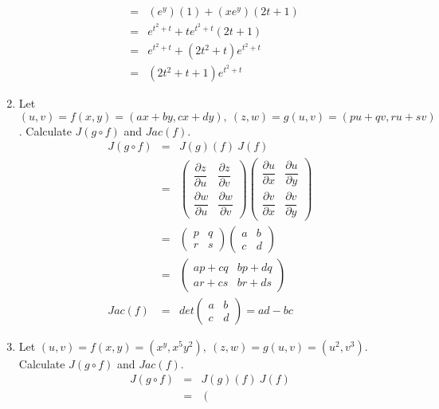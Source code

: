 \documentclass[a4paper,10pt]{article}
\begin{document}
\begin{enumerate}
\begin{eqnarray}
	&=& (e^y)(1) + (xe^y)(2t+1) \\ \nonumber
	&=& e^{t^2+t} + t e^{t^2+t} (2t+1) \\ \nonumber
	&=& e^{t^2+t} + (2t^2+t)e^{t^2+t} \\ \nonumber
	&=& (2t^2+t+1)e^{t^2+t} 
	\end{eqnarray}
	\item Let $ (u,v) = f(x,y) = (ax+by, cx+dy) , \ (z,w) = g(u,v) = (pu+qv , ru+sv) $. Calculate $ J(g \circ f) $ and $ Jac(f) $.
	\begin{eqnarray}\nonumber
	J(g \circ f) &=& J(g)(f) \ J(f) \\ \nonumber
	&=& \left( \begin{array}{cc}
	\dfrac{\partial z}{\partial u} & \dfrac{\partial z}{\partial v} \\
	\dfrac{\partial w}{\partial u} & \dfrac{\partial w}{\partial v}
	\end{array} \right)
	\left( \begin{array}{cc}
	\dfrac{\partial u}{\partial x} & \dfrac{\partial u}{\partial y} \\
	\dfrac{\partial v}{\partial x} & \dfrac{\partial v}{\partial y}
	\end{array} \right) \\ \nonumber
	&=& \left( \begin{array}{cc}
	p & q \\ r & s
	\end{array} \right)
	\left( \begin{array}{cc}
	a & b \\ c & d
	\end{array} \right) \\ \nonumber
	&=& \left( \begin{array}{cc}
	ap+cq & bp+dq \\
	ar+cs & br+ds
	\end{array} \right) \\ \nonumber
	Jac(f) &=& det \left( \begin{array}{cc}
	a & b \\
	c & d
	\end{array} \right) = ad-bc
	\end{eqnarray}
	\item Let $ (u,v) = f(x,y) = (x^y,x^5y^2) , \ (z,w) = g(u,v) = (u^2,v^3) $. Calculate $ J(g \circ f) $ and $ Jac(f) $.
	\begin{eqnarray}\nonumber
	J(g \circ f) &=& J(g)(f) \ J(f) \\ \nonumber
	&=& \left( \begin{array}{cc}

\end{array}
\end{eqnarray}
\end{enumerate}
\end{document}
